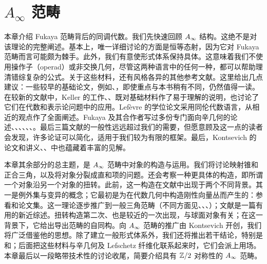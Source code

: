 \chapter{\texorpdfstring{$A_\infty$}{A∞} 范畴}
\label{chapter:I}
本章介绍 Fukaya 范畴背后的同调代数。我们先快速回顾 $A_\infty$ 结构。这绝不是对该理论的完整阐述。基本上，唯一详细讨论的方面是恒等态射，因为它对 Fukaya 范畴而言可能颇为棘手。此外，我们有意使形式体系保持具体。这意味着我们不使用操作子（operad）或非交换几何，尽管这两种语言中的任何一种，都可以帮助理清错综复杂的公式。关于这些材料，还有风格各异的其他参考文献。这里给出几点建议：一些较早的基础论文，例如、，即使重点与本书稍有不同，仍然值得一读。在较新的文献中，Keller 的工作、、既对基础材料作了易于理解的说明，也讨论了它们在代数和表示论问题中的应用。Lefèvre 的学位论文采用同伦代数语言，从相近的观点作了全面阐述。Fukaya 及其合作者写过多份专门面向辛几何的论述、、、、、、。最后三篇文献的一般性远远超过我们的需要，但愿意顾及这一点的读者会发现，许多论证可以简化，适用于我们较为有限的框架。最后，Kontsevich 的论文和讲义、、中也蕴藏着丰富的见解。

本章其余部分的总主题，是 $A_\infty$ 范畴中对象的构造与运用。我们将讨论映射锥和正合三角，以及将对象分裂成直和项的问题。还会考察一种更具体的构造，即所谓一个对象沿另一个对象的扭转。此前，这一构造在文献中出现于两个不同背景。其一是例外集与变异的概念；它最初是为在代数几何中构造刚性向量丛而产生的：参看和论文集。这一理论逐步推广到一般三角范畴（不同方面见、、、）；文献是一篇有用的新近综述。扭转构造第二次、也是较近的一次出现，与球面对象有关；在这一背景下，它给出导出范畴的自同构。向 $A_\infty$ 范畴的推广由 Kontsevich 开创，我们将广泛借鉴他的思想。除了建立一般形式体系外，我们还将推出若干结论，特别是和；后面把这些材料与辛几何及 Lefschetz 纤维化联系起来时，它们会派上用场。本章最后以一段略带技术性的讨论收尾，简要介绍具有 $\mathbb Z/2$ 对称性的 $A_\infty$ 范畴。
